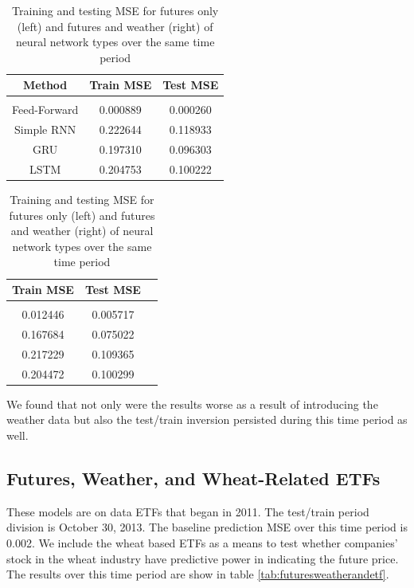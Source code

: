 \documentclass[twoside,11pt]{article}
\begin{document}
\begin{table}[h!]
	\begin{center}
		\begin{tabular}{ccc}
			Method & Train MSE & Test MSE \\
			\hline \\[-11pt]
			Feed-Forward & 0.000889 & 0.000260 \\
			Simple RNN & 0.222644 & 0.118933 \\ 
			GRU & 0.197310 & 0.096303 \\
			LSTM & 0.204753 & 0.100222 \\
			\hline
		\end{tabular}
	\quad
		\begin{tabular}{ccc}
			Train MSE & Test MSE \\
			\hline \\[-11pt]
			0.012446 & 0.005717 \\
			0.167684 & 0.075022 \\ 
			0.217229 & 0.109365 \\
			0.204472 & 0.100299 \\
			\hline
		\end{tabular}
		\label{tab:futuresandweather}
		\caption{Training and testing MSE for futures only (left) and futures and weather (right) of neural network types over the same time period}
	\end{center}
\end{table}

We found that not only were the results worse as a result of introducing the weather data but also the test/train inversion persisted during this time period as well.


\subsection{Futures, Weather, and Wheat-Related ETFs}

These models are on data ETFs that began in 2011. The test/train period division is October 30, 2013. The baseline prediction MSE over this time period is 0.002. We include the wheat based ETFs as a means to test whether companies' stock in the wheat industry have predictive power in indicating the future price. The results over this time period are show in table \ref{tab:futuresweatherandetf}.
\end{document}
